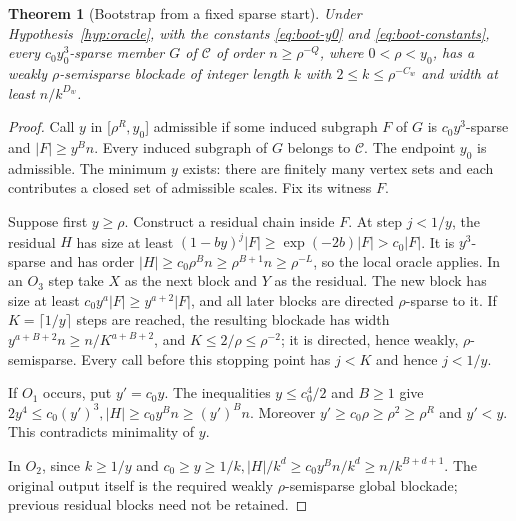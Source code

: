 \documentclass[11pt,a4paper]{article}
\newtheorem{theorem}{Theorem}[section]
\theoremstyle{definition}
\theoremstyle{remark}
\numberwithin{equation}{section}
\begin{document}
\begin{theorem}[Bootstrap from a fixed sparse start]\label{thm:bootstrap}
Under Hypothesis~\ref{hyp:oracle}, with the constants \eqref{eq:boot-y0} and \eqref{eq:boot-constants}, every \(c_{0} y_{0}^{3}\)-sparse member \(G\) of \(\mathcal C\) of order \(n\ge \rho^{-Q}\), where \(0<\rho<y_{0}\), has a weakly \(\rho\)-semisparse blockade of integer length \(k\) with \(2\le k\le \rho^{-C_{w}}\) and width at least \(n/k^{D_{w}}\).
\end{theorem}
\begin{proof}
Call \(y\) in [\(\rho^{R},\allowbreak y_{0}\)] admissible if some induced subgraph \(F\) of \(G\) is \(c_{0} y^{3}\)-sparse and \(|F|\ge\allowbreak y^{B} n\). Every induced subgraph of \(G\) belongs to \(\mathcal C\). The endpoint \(y_{0}\) is admissible. The minimum \(y\) exists: there are finitely many vertex sets and each contributes a closed set of admissible scales. Fix its witness \(F\).

Suppose first \(y\ge\allowbreak \rho\). Construct a residual chain inside \(F\). At step \(j<1/y\), the residual \(H\) has size at least \((1-by)^{j}|F|\ge\allowbreak \exp (-2b)|F|>c_{0}|F|\). It is \(y^{3}\)-sparse and has order \(|H|\ge\allowbreak c_{0} \rho^{B} n\ge\allowbreak \rho^{B+1}n\ge\allowbreak \rho^{-L}\), so the local oracle applies. In an \(O_{3}\) step take \(X\) as the next block and \(Y\) as the residual. The new block has size at least \(c_{0} y^{a}|F|\ge\allowbreak y^{a+2}|F|\), and all later blocks are directed \(\rho\)-sparse to it. If \(K=\lceil 1/y\rceil\) steps are reached, the resulting blockade has width \(y^{a+B+2}n\ge\allowbreak n/K^{a+B+2}\), and \(K\le\allowbreak 2/\rho\le\allowbreak \rho^{-2}\); it is directed, hence weakly, \(\rho\)-semisparse. Every call before this stopping point has \(j<K\) and hence \(j<1/y\).

If \(O_{1}\) occurs, put \(y'=c_{0} y\). The inequalities \(y\le\allowbreak c_{0}^{4}/2\) and \(B\ge\allowbreak 1\) give \(2y^{4}\le\allowbreak c_{0}(y')^{3},\allowbreak  |H|\ge\allowbreak c_{0} y^{B} n\ge\allowbreak (y')^{B} n\). Moreover \(y'\ge\allowbreak c_{0} \rho\ge\allowbreak \rho^{2}\ge\allowbreak \rho^{R}\) and \(y'<y\). This contradicts minimality of \(y\).

In \(O_{2}\), since \(k\ge\allowbreak 1/y\) and \(c_{0}\ge\allowbreak y\ge\allowbreak 1/k,\allowbreak  |H|/k^{d}\ge\allowbreak c_{0} y^{B} n/k^{d}\ge\allowbreak n/k^{B+d+1}\). The original output itself is the required weakly \(\rho\)-semisparse global blockade; previous residual blocks need not be retained.


\end{proof}
\end{document}
